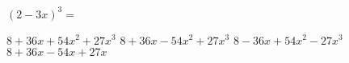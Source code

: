 
\question $(2 - 3x)^3 = $

  \begin{oneparchoices}
    \choice $8 + 36x + 54x^2 + 27x^3$
    \choice $8 + 36x - 54x^2 + 27x^3$
    \CorrectChoice $8 - 36x + 54x^2 - 27x^3$
    \choice $8 + 36x - 54x + 27x$
  \end{oneparchoices}
